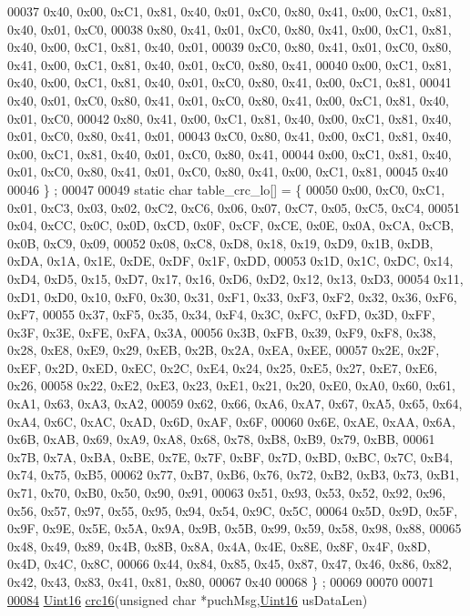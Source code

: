 \begin{DoxyCode}
00037 0x40, 0x00, 0xC1, 0x81, 0x40, 0x01, 0xC0, 0x80, 0x41, 0x00, 0xC1, 0x81, 0x40, 0x01, 0xC0,
00038 0x80, 0x41, 0x01, 0xC0, 0x80, 0x41, 0x00, 0xC1, 0x81, 0x40, 0x00, 0xC1, 0x81, 0x40, 0x01,
00039 0xC0, 0x80, 0x41, 0x01, 0xC0, 0x80, 0x41, 0x00, 0xC1, 0x81, 0x40, 0x01, 0xC0, 0x80, 0x41,
00040 0x00, 0xC1, 0x81, 0x40, 0x00, 0xC1, 0x81, 0x40, 0x01, 0xC0, 0x80, 0x41, 0x00, 0xC1, 0x81,
00041 0x40, 0x01, 0xC0, 0x80, 0x41, 0x01, 0xC0, 0x80, 0x41, 0x00, 0xC1, 0x81, 0x40, 0x01, 0xC0,
00042 0x80, 0x41, 0x00, 0xC1, 0x81, 0x40, 0x00, 0xC1, 0x81, 0x40, 0x01, 0xC0, 0x80, 0x41, 0x01,
00043 0xC0, 0x80, 0x41, 0x00, 0xC1, 0x81, 0x40, 0x00, 0xC1, 0x81, 0x40, 0x01, 0xC0, 0x80, 0x41,
00044 0x00, 0xC1, 0x81, 0x40, 0x01, 0xC0, 0x80, 0x41, 0x01, 0xC0, 0x80, 0x41, 0x00, 0xC1, 0x81,
00045 0x40
00046 \} ;
00047 
00049 \textcolor{keyword}{static} \textcolor{keywordtype}{char} table\_crc\_lo[] = \{
00050 0x00, 0xC0, 0xC1, 0x01, 0xC3, 0x03, 0x02, 0xC2, 0xC6, 0x06, 0x07, 0xC7, 0x05, 0xC5, 0xC4,
00051 0x04, 0xCC, 0x0C, 0x0D, 0xCD, 0x0F, 0xCF, 0xCE, 0x0E, 0x0A, 0xCA, 0xCB, 0x0B, 0xC9, 0x09,
00052 0x08, 0xC8, 0xD8, 0x18, 0x19, 0xD9, 0x1B, 0xDB, 0xDA, 0x1A, 0x1E, 0xDE, 0xDF, 0x1F, 0xDD,
00053 0x1D, 0x1C, 0xDC, 0x14, 0xD4, 0xD5, 0x15, 0xD7, 0x17, 0x16, 0xD6, 0xD2, 0x12, 0x13, 0xD3,
00054 0x11, 0xD1, 0xD0, 0x10, 0xF0, 0x30, 0x31, 0xF1, 0x33, 0xF3, 0xF2, 0x32, 0x36, 0xF6, 0xF7,
00055 0x37, 0xF5, 0x35, 0x34, 0xF4, 0x3C, 0xFC, 0xFD, 0x3D, 0xFF, 0x3F, 0x3E, 0xFE, 0xFA, 0x3A,
00056 0x3B, 0xFB, 0x39, 0xF9, 0xF8, 0x38, 0x28, 0xE8, 0xE9, 0x29, 0xEB, 0x2B, 0x2A, 0xEA, 0xEE,
00057 0x2E, 0x2F, 0xEF, 0x2D, 0xED, 0xEC, 0x2C, 0xE4, 0x24, 0x25, 0xE5, 0x27, 0xE7, 0xE6, 0x26,
00058 0x22, 0xE2, 0xE3, 0x23, 0xE1, 0x21, 0x20, 0xE0, 0xA0, 0x60, 0x61, 0xA1, 0x63, 0xA3, 0xA2,
00059 0x62, 0x66, 0xA6, 0xA7, 0x67, 0xA5, 0x65, 0x64, 0xA4, 0x6C, 0xAC, 0xAD, 0x6D, 0xAF, 0x6F,
00060 0x6E, 0xAE, 0xAA, 0x6A, 0x6B, 0xAB, 0x69, 0xA9, 0xA8, 0x68, 0x78, 0xB8, 0xB9, 0x79, 0xBB,
00061 0x7B, 0x7A, 0xBA, 0xBE, 0x7E, 0x7F, 0xBF, 0x7D, 0xBD, 0xBC, 0x7C, 0xB4, 0x74, 0x75, 0xB5,
00062 0x77, 0xB7, 0xB6, 0x76, 0x72, 0xB2, 0xB3, 0x73, 0xB1, 0x71, 0x70, 0xB0, 0x50, 0x90, 0x91,
00063 0x51, 0x93, 0x53, 0x52, 0x92, 0x96, 0x56, 0x57, 0x97, 0x55, 0x95, 0x94, 0x54, 0x9C, 0x5C,
00064 0x5D, 0x9D, 0x5F, 0x9F, 0x9E, 0x5E, 0x5A, 0x9A, 0x9B, 0x5B, 0x99, 0x59, 0x58, 0x98, 0x88,
00065 0x48, 0x49, 0x89, 0x4B, 0x8B, 0x8A, 0x4A, 0x4E, 0x8E, 0x8F, 0x4F, 0x8D, 0x4D, 0x4C, 0x8C,
00066 0x44, 0x84, 0x85, 0x45, 0x87, 0x47, 0x46, 0x86, 0x82, 0x42, 0x43, 0x83, 0x41, 0x81, 0x80,
00067 0x40
00068 \} ;
00069 
00070 
00071 
\hypertarget{a00060_source_l00084}{}\hyperlink{a00060_a6553827687db2137ee550ad6e1d2f316}{00084} \hyperlink{a00072_a59a9f6be4562c327cbfb4f7e8e18f08b}{Uint16} \hyperlink{a00060_a6553827687db2137ee550ad6e1d2f316}{crc16}(\textcolor{keywordtype}{unsigned} \textcolor{keywordtype}{char} *puchMsg,\hyperlink{a00072_a59a9f6be4562c327cbfb4f7e8e18f08b}{Uint16} usDataLen)

\end{DoxyCode}
